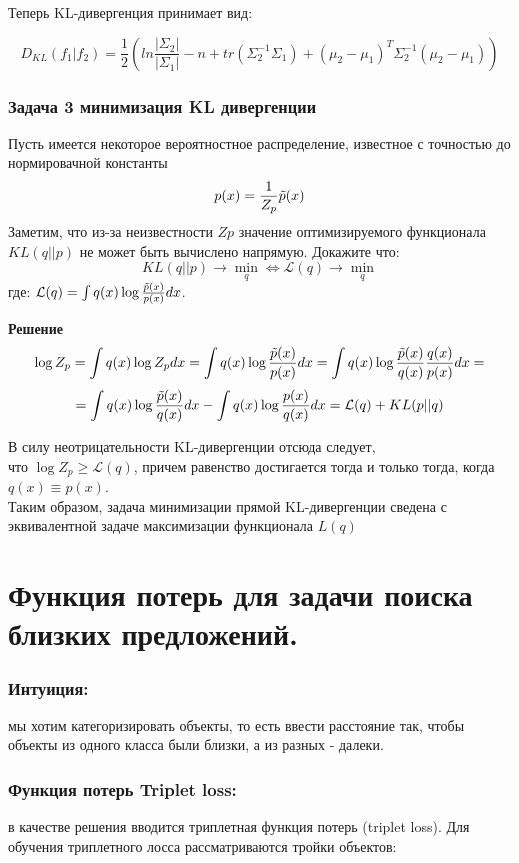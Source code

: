 Теперь KL-дивергенция принимает вид:

\[
    D_{KL}(f_1 | f_2) = \frac{1}{2} (ln\frac{|\Sigma_2|}{|\Sigma_1|} - n + tr(\Sigma_2^{-1}\Sigma_1) + (\mu_2 - \mu_1)^T\Sigma_2^{-1}(\mu_2 - \mu_1))
\]

\subsubsection*{Задача 3 минимизация KL дивергенции}
Пусть имеется некоторое вероятностное распределение, известное с точностью до нормировачной константы
\[p(x) = \frac{1}{Z_p}\Tilde{p}(x) \]
Заметим, что из-за неизвестности $Zp$ значение оптимизируемого
функционала $KL(q||p)$ не может быть вычислено напрямую.
Докажите что:
\[KL(q||p) \rightarrow \underset{q}{\min} \Leftrightarrow \mathcal{L}(q) \rightarrow \underset{q}{\min}\]
где: $\mathcal{L}(q) = \int q(x) \log \frac{\Tilde{p}(x)}{p(x)}dx$.


\textbf{Решение}
\[
    \log Z_p = \int q(x) \log Z_pdx  = \int q(x) \log \frac{\Tilde{p}(x)}{p(x)}dx = \int q(x) \log \frac{\Tilde{p}(x)}{q(x)}\frac{q(x)}{p(x)}dx
    = \]
\[
    = \int q(x) \log \frac{\Tilde{p}(x)}{q(x)}dx - \int q(x) \log \frac{p(x)}{q(x)}dx = \mathcal{L}(q) + KL(p||q)
\]

В силу неотрицательности KL-дивергенции отсюда следует,\\ что $\log Z_p \geq \mathcal{L}(q)$, причем равенство
достигается тогда и только тогда, когда $q(x) \equiv p(x)$. \\
Таким образом, задача минимизации прямой KL-дивергенции сведена с эквивалентной задаче максимизации функционала $L(q)$


\section*{Функция потерь для задачи поиска близких предложений.}

\subsubsection*{Интуиция:}
мы хотим категоризировать объекты, то есть ввести расстояние так, чтобы объекты из одного класса были близки, а из разных - далеки.

\subsubsection*{Функция потерь Triplet loss:}
в качестве решения вводится триплетная функция потерь (triplet loss).
Для обучения триплетного лосса рассматриваются тройки объектов:

